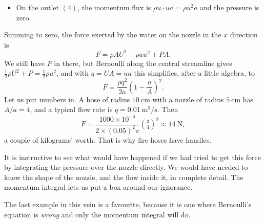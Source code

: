 \begin{example}
\begin{itemize}
		\item On the outlet $(4)$, the momentum flux is $\rho u \cdot u a = \rho u^2 a$ and the pressure is zero.
	\end{itemize}
	Summing to zero, the force exerted by the water on the nozzle in the $x$ direction is
	$$
	F = \rho A U^2 - \rho a u^2 + PA.
	$$
	We still have $P$ in there, but Bernoulli along the central streamline gives $\tfrac{1}{2}\rho U^2 + P = \tfrac{1}{2}\rho u^2$, and with $q = UA = ua$ this simplifies, after a little algebra, to
	$$
	F = \frac{\rho q^2}{2a}\left(1 - \frac{a}{A}\right)^2.
	$$
	Let us put numbers in. A hose of radius $\SI{10}{\centi\meter}$ with a nozzle of radius $\SI{5}{\centi\meter}$ has $A/a = 4$, and a typical flow rate is $q = \SI{0.01}{\meter\cubed\per\second}$. Then
	$$
	F = \frac{1000 \times 10^{-4}}{2 \times (0.05)^2\pi}\left(\tfrac{3}{4}\right)^2 \approx \SI{14}{\newton},
	$$
	a couple of kilograms' worth. That is why fire hoses have handles.
\end{example}

\begin{remark}
	It is instructive to see what would have happened if we had tried to get this force by integrating the pressure over the nozzle directly. We would have needed to know the shape of the nozzle, and the flow inside it, in complete detail. The momentum integral lets us put a box around our ignorance.
\end{remark}

The last example in this vein is a favourite, because it is one where Bernoulli's equation is \emph{wrong} and only the momentum integral will do.


